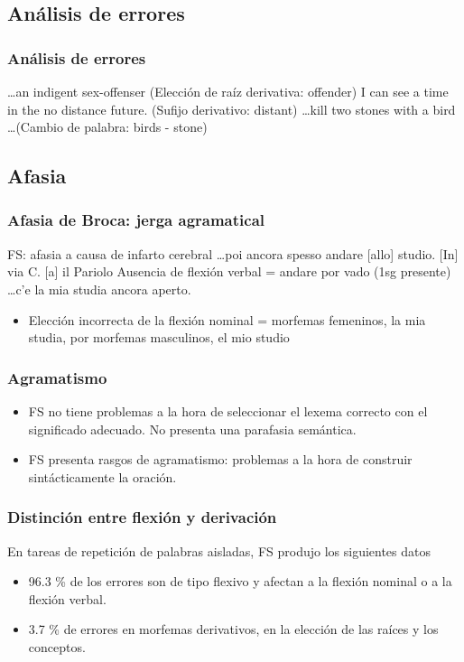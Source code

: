 \documentclass[compress]{beamer}
\begin{document}
	\subsection{Análisis de errores}
	\begin{frame}
	\frametitle{Análisis de errores}

	\pex[*]
\a \ldots an indigent sex-\alert{offens}er (Elección de raíz derivativa: \alert{offend}er)
\a I can see a time in the no distan\alert{ce} future. (Sufijo derivativo: dista\alert{nt})
\a \ldots kill two \alert{stone}s with a \alert{bird} \ldots (Cambio de palabra: \alert{bird}s - \alert{stone})
\xe
	\end{frame}

	\begin{frame}
	\subsection{Afasia}
	\frametitle{Afasia de Broca: jerga agramatical}

	FS: afasia a causa de infarto cerebral
	\pex[*]
\a \ldots poi ancora spesso \alert{andare} [allo] studio. [In] via C. [a] il Pariolo
\a Ausencia de flexión verbal = \alert{andare} por \alert{vado} (1sg presente)
\a \ldots c'e \alert{la mia studia} ancora aperto.
\xe
	
\begin{itemize}
	  \item Elección incorrecta de la flexión nominal = morfemas
	  femeninos, l\alert{a} mi\alert{a} studi\alert{a}, por morfemas masculinos, \alert{e}l mi\alert{o} studi\alert{o}
	\end{itemize}
\end{frame}



	\begin{frame}
	\frametitle{Agramatismo}
	\begin{itemize}
	\item FS no tiene problemas a la hora de seleccionar el lexema
	correcto con el significado adecuado. No presenta una parafasia
	semántica.
	\item FS presenta rasgos de agramatismo: problemas a la hora de
	construir sintácticamente la oración.
	\end{itemize}

	\end{frame}


	\begin{frame}
	\frametitle{Distinción entre flexión y derivación} En tareas de
	repetición de palabras aisladas, FS produjo los siguientes datos

	\begin{itemize}
	\item 96.3 \% de los errores son de tipo flexivo y afectan a la
	flexión nominal o a la flexión verbal.

	\item 3.7 \% de errores en morfemas derivativos, en la elección de
	las raíces y los conceptos.
	\end{itemize}

	\end{frame}
\end{document}
